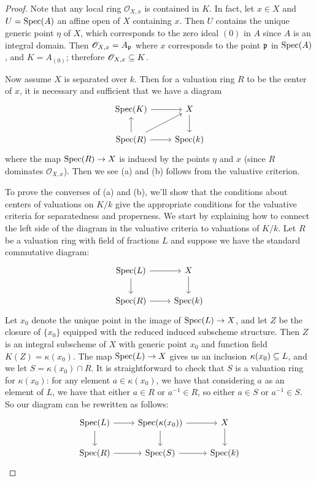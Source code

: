 \documentclass[11pt]{book}
\theoremstyle{definition}
\begin{document}
\begin{proof}
Note that any local ring $\mathscr{O}_{X,x}$ is contained in $K$. In fact, let $x\in X$ and $U=\mathrm{Spec}(A)$ an affine open of $X$ containing $x$. Then $U$ contains the unique generic point $\eta$ of $X$, which corresponds to the zero ideal $(0)$ in $A$ since $A$ is an integral domain. Then $\mathscr{O}_{X,x}=A_{\mathfrak{p}}$ where $x$ corresponds to the point $\mathfrak{p}$ in $\mathrm{Spec}(A)$, and $K=A_{(0)}$; therefore $\mathscr{O}_{X,x}\subseteq K$.\par
Now assume $X$ is separated over $k$. Then for a valuation ring $R$ to be the center of $x$, it is necessary and sufficient that we have a diagram
\[\begin{tikzcd}
\Spec(K)\ar[r]&X\ar[d]\\
\Spec(R)\ar[u]\ar[ru]\ar[r]&\Spec(k)
\end{tikzcd}\]
where the map $\mathrm{Spec}(R)\to X$ is induced by the points $\eta$ and $x$ (since $R$ dominates $\mathscr{O}_{X,x}$). Then we see (a) and (b) follows from the valuative criterion.\par
To prove the converses of (a) and (b), we'll show that the conditions about centers of valuations on $K/k$ give the appropriate conditions for the valuative criteria for separatedness and properness. We start by explaining how to connect the left side of the diagram in the valuative criteria to valuations of $K/k$. Let $R$ be a valuation ring with field of fractions $L$ and suppose we have the standard commutative diagram:
\[\begin{tikzcd}
\Spec(L)\ar[r]\ar[d]&X\ar[d]\\
\Spec(R)\ar[r]&\Spec(k)
\end{tikzcd}\]
Let $x_0$ denote the unique point in the image of $\mathrm{Spec}(L)\to X$, and let $Z$ be the closure of $\{x_0\}$ equipped with the reduced induced subscheme structure. Then $Z$ is an integral subscheme of $X$ with generic point $x_0$ and function field $K(Z)=\kappa(x_0)$. The map $\mathrm{Spec}(L)\to X$ gives us an inclusion $\kappa(x_0)\subseteq L$, and we let $S=\kappa(x_0)\cap R$. It is straightforward to check that $S$ is a valuation ring for $\kappa(x_0)$: for any element $a\in\kappa(x_0)$, we have that considering $a$ as an element of $L$, we have that either $a\in R$ or $a^{-1}\in R$, so either $a\in S$ or $a^{-1}\in S$. So our diagram can be rewritten as follows:
\[\begin{tikzcd}
\Spec(L)\ar[r]\ar[d]&\Spec(\kappa(x_0))\ar[d]\ar[r]&X\ar[d]\\
\Spec(R)\ar[r]&\Spec(S)\ar[r]&\Spec(k)
\end{tikzcd}\]

\end{proof}
\end{document}
